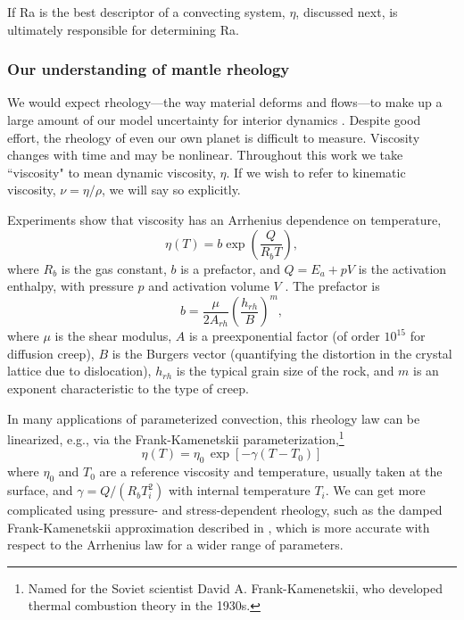 If Ra is the best descriptor of a convecting system, $\eta$, discussed next, is ultimately responsible for determining Ra.



\subsubsection{Our understanding of mantle rheology}\label{sec:rheology}

We would expect rheology---the way material deforms and flows---to make up a large amount of our model uncertainty for interior dynamics \citep{Dumoulin2013}. Despite good effort, the rheology of even our own planet is difficult to measure. Viscosity changes with time and may be nonlinear. Throughout this work we take ``viscosity" to mean dynamic viscosity, $\eta$. If we wish to refer to kinematic viscosity, $\nu = \eta / \rho$, we will say so explicitly. 

Experiments show that viscosity has an Arrhenius dependence on temperature,
\begin{equation}\label{eq:eta_Arrhenius}
\eta(T) = b \exp\left(\frac{Q}{R_b T}\right),
\end{equation}
where $R_b$ is the gas constant, $b$ is a prefactor, and $Q = E_a + pV$ is the activation enthalpy, with pressure $p$ and activation volume $V$ \citep{Karato1993}. The prefactor is
\begin{equation}\label{eq:eta_b}
b = \frac{\mu}{2 A_{rh}} \left(\frac{h_{rh}}{B}\right)^m,
\end{equation}
where $\mu$ is the shear modulus, $A$ is a preexponential factor (of order $10^{15}$ for diffusion creep), $B$ is the Burgers vector (quantifying the distortion in the crystal lattice due to dislocation), $h_{rh}$ is the typical grain size of the rock, and $m$ is an exponent characteristic to the type of creep.

In many applications of parameterized convection, this rheology law can be linearized, e.g., via the Frank-Kamenetskii parameterization,\footnote{Named for the Soviet scientist David A. Frank-Kamenetskii, who developed thermal combustion theory in the 1930s.}
\begin{equation}
\eta(T) = \eta_0 \, \exp{\left[-\gamma \left(T - T_0\right)\right]}
\end{equation}
where $\eta_0$ and $T_0$ are a reference viscosity and temperature, usually taken at the surface, and $\gamma = Q/(R_b T_i^2)$ with internal temperature $T_i$. We can get more complicated using pressure- and stress-dependent rheology, such as the damped Frank-Kamenetskii approximation described in \citet{Noack2013}, which is more accurate with respect to the Arrhenius law for a wider range of parameters.

